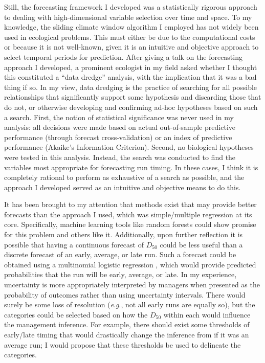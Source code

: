 \documentclass[12pt,]{book}
\theoremstyle{definition}
\theoremstyle{definition}
\theoremstyle{definition}
\theoremstyle{remark}
\begin{document}
Still, the forecasting framework I developed was a statistically
rigorous approach to dealing with high-dimensional variable selection
over time and space. To my knowledge, the sliding climate window
algorithm I employed has not widely been used in ecological problems.
This must either be due to the computational costs or because it is not
well-known, given it is an intuitive and objective approach to select
temporal periods for prediction. After giving a talk on the forecasting
approach I developed, a prominent ecologist in my field asked whether I
thought this constituted a ``data dredge'' analysis, with the
implication that it was a bad thing if so. In my view, data dredging is
the practice of searching for all possible relationships that
significantly support some hypothesis and discarding those that do not,
or otherwise developing and confirming ad-hoc hypotheses based on such a
search. First, the notion of statistical significance was never used in
my analysis: all decisions were made based on actual out-of-sample
predictive performance (through forecast cross-validation) or an index
of predictive performance (Akaike's Information Criterion). Second, no
biological hypotheses were tested in this analysis. Instead, the search
was conducted to find the variables most appropriate for forecasting run
timing. In these cases, I think it is completely rational to perform as
exhaustive of a search as possible, and the approach I developed served
as an intuitive and objective means to do this.

It has been brought to my attention that methods exist that may provide
better forecasts than the approach I used, which was simple/multiple
regression at its core. Specifically, machine learning tools like random
forests could show promise for this problem and others like it.
Additionally, upon further reflection it is possible that having a
continuous forecast of \(D_{50}\) could be less useful than a discrete
forecast of an early, average, or late run. Such a forecast could be
obtained using a multinomial logistic regression \citep[Ch.
7]{agresti-2002}, which would provide predicted probabilities that the
run will be early, average, or late. In my experience, uncertainty is
more appropriately interpreted by managers when presented as the
probability of outcomes rather than using uncertainty intervals. There
would surely be some loss of resolution (\emph{e}.\emph{g}., not all
early runs are equally so), but the categories could be selected based
on how the \(D_{50}\) within each would influence the management
inference. For example, there should exist some thresholds of early/late
timing that would drastically change the inference from if it was an
average run; I would propose that these thresholds be used to delineate
the categories.
\end{document}
